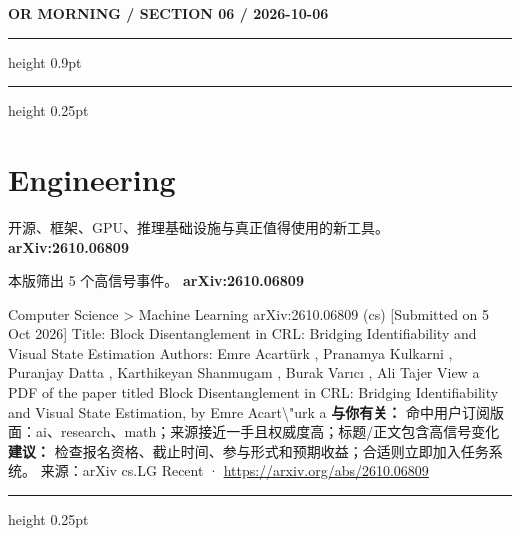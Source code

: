 \documentclass[10.5pt]{ctexart}
\begin{document}
\newpage
{\small\bfseries OR MORNING / SECTION 06 / 2026-10-06}
\vspace{2mm}
\hrule height 0.9pt
\vspace{1.5mm}
\hrule height 0.25pt
\vspace{4mm}
\section*{Engineering}
{\color{ormuted} 开源、框架、GPU、推理基础设施与真正值得使用的新工具。}
\vspace{2mm}
{\LARGE\bfseries arXiv:2610.06809}\par
\vspace{1mm}
{\color{ormuted} 本版筛出 5 个高信号事件。}
\vspace{3mm}
{\Large\bfseries arXiv:2610.06809}\par
Computer Science > Machine Learning arXiv:2610.06809 (cs) [Submitted on 5 Oct 2026] Title: Block Disentanglement in CRL: Bridging Identifiability and Visual State Estimation Authors: Emre Acartürk , Pranamya Kulkarni , Puranjay Datta , Karthikeyan Shanmugam , Burak Varıcı , Ali Tajer View a PDF of the paper titled Block Disentanglement in CRL: Bridging Identifiability and Visual State Estimation, by Emre Acart\textbackslash{}"urk a
\textbf{与你有关：} 命中用户订阅版面：ai、research、math；来源接近一手且权威度高；标题/正文包含高信号变化
\textbf{建议：} 检查报名资格、截止时间、参与形式和预期收益；合适则立即加入任务系统。
{\footnotesize\color{ormuted} 来源：arXiv cs.LG Recent · \url{https://arxiv.org/abs/2610.06809}}
\vspace{4mm}
\hrule height 0.25pt
\vspace{3mm}
\end{document}
